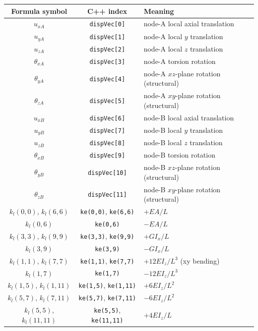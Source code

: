 \documentclass[11pt,a4paper]{article}
\begin{document}
\begin{longtable}{c c l}
\toprule
Formula symbol & C++ index & Meaning \\
\midrule \endhead
$u_{xA}$        & \texttt{dispVec[0]}  & node-A local axial translation \\
$u_{yA}$        & \texttt{dispVec[1]}  & node-A local $y$ translation \\
$u_{zA}$        & \texttt{dispVec[2]}  & node-A local $z$ translation \\
$\theta_{xA}$   & \texttt{dispVec[3]}  & node-A torsion rotation \\
$\theta_{yA}$   & \texttt{dispVec[4]}  & node-A $xz$-plane rotation (structural) \\
$\theta_{zA}$   & \texttt{dispVec[5]}  & node-A $xy$-plane rotation (structural) \\
$u_{xB}$        & \texttt{dispVec[6]}  & node-B local axial translation \\
$u_{yB}$        & \texttt{dispVec[7]}  & node-B local $y$ translation \\
$u_{zB}$        & \texttt{dispVec[8]}  & node-B local $z$ translation \\
$\theta_{xB}$   & \texttt{dispVec[9]}  & node-B torsion rotation \\
$\theta_{yB}$   & \texttt{dispVec[10]} & node-B $xz$-plane rotation (structural) \\
$\theta_{zB}$   & \texttt{dispVec[11]} & node-B $xy$-plane rotation (structural) \\
\midrule
$k_l(0,0)$, $k_l(6,6)$    & \texttt{ke(0,0)}, \texttt{ke(6,6)}   & $+EA/L$ \\
$k_l(0,6)$                & \texttt{ke(0,6)}                     & $-EA/L$ \\
$k_l(3,3)$, $k_l(9,9)$    & \texttt{ke(3,3)}, \texttt{ke(9,9)}   & $+G I_x/L$ \\
$k_l(3,9)$                & \texttt{ke(3,9)}                     & $-G I_x/L$ \\
$k_l(1,1)$, $k_l(7,7)$    & \texttt{ke(1,1)}, \texttt{ke(7,7)}   & $+12 E I_z/L^3$ (xy bending) \\
$k_l(1,7)$                & \texttt{ke(1,7)}                     & $-12 E I_z/L^3$ \\
$k_l(1,5)$, $k_l(1,11)$   & \texttt{ke(1,5)}, \texttt{ke(1,11)}  & $+6 E I_z/L^2$ \\
$k_l(5,7)$, $k_l(7,11)$   & \texttt{ke(5,7)}, \texttt{ke(7,11)}  & $-6 E I_z/L^2$ \\
$k_l(5,5)$, $k_l(11,11)$  & \texttt{ke(5,5)}, \texttt{ke(11,11)} & $+4 E I_z/L$ \\

\end{longtable}
\end{document}
